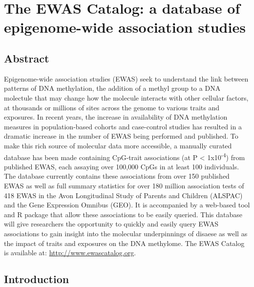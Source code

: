 \documentclass[11pt,twoside]{bristolthesis}
\begin{document}
\hypertarget{the-ewas-catalog-a-database-of-epigenome-wide-association-studies}{%
\chapter{The EWAS Catalog: a database of epigenome-wide association studies}\label{the-ewas-catalog-a-database-of-epigenome-wide-association-studies}}

\hypertarget{abstract}{%
\section{Abstract}\label{abstract}}

Epigenome-wide association studies (EWAS) seek to understand the link between patterns of DNA methylation, the addition of a methyl group to a DNA molectule that may change how the molecule interacts with other cellular factors, at thousands or millions of sites across the genome to various traits and exposures. In recent years, the increase in availability of DNA methylation measures in population-based cohorts and case-control studies has resulted in a dramatic increase in the number of EWAS being performed and published. To make this rich source of molecular data more accessible, a manually curated database has been made containing CpG-trait associations (at P \textless{} 1x10\textsuperscript{-4}) from published EWAS, each assaying over 100,000 CpGs in at least 100 individuals. The database currently contains these associations from over 150 published EWAS as well as full summary statistics for over 180 million association tests of 418 EWAS in the Avon Longitudinal Study of Parents and Children (ALSPAC) and the Gene Expression Omnibus (GEO). It is accompanied by a web-based tool and R package that allow these associations to be easily queried. This database will give researchers the opportunity to quickly and easily query EWAS associations to gain insight into the molecular underpinnings of disaese as well as the impact of traits and exposures on the DNA methylome. The EWAS Catalog is available at: \url{http://www.ewascatalog.org}.

\hypertarget{introduction-1}{%
\section{Introduction}\label{introduction-1}}
\end{document}
